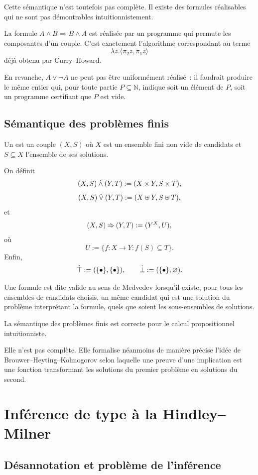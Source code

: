 Cette sémantique n'est toutefois pas complète. Il existe des formules
réalisables qui ne sont pas démontrables intuitionnistement.

\thingy La formule $A\land B\Rightarrow B\land A$ est réalisée par un
programme qui permute les composantes d'un couple. C'est exactement
l'algorithme correspondant au terme
\[
\lambda z.\langle\pi_2z,\pi_1z\rangle
\]
déjà obtenu par Curry--Howard.

En revanche, $A\lor\neg A$ ne peut pas être uniformément réalisé : il
faudrait produire le même entier qui, pour toute partie
$P\subseteq\mathbb{N}$, indique soit un élément de $P$, soit un
programme certifiant que $P$ est vide.

\subsection{Sémantique des problèmes finis}

\thingy Un  est un couple $(X,S)$ où $X$ est un
ensemble fini non vide de candidats et $S\subseteq X$ l'ensemble de ses
solutions.

On définit
\[
(X,S)\mathbin{\mathbin{\dot\land}}(Y,T)
 :=(X\times Y,S\times T),
\]
\[
(X,S)\mathbin{\mathbin{\dot\lor}}(Y,T)
 :=(X\uplus Y,S\uplus T),
\]
et
\[
(X,S)\mathbin{\mathbin{\dot\Rightarrow}}(Y,T)
 :=(Y^X,U),
\]
où
\[
U:=\{f:X\to Y:f(S)\subseteq T\}.
\]
Enfin,
\[
\mathord{\dot\top}:=(\{\bullet\},\{\bullet\}),
\qquad
\mathord{\dot\bot}:=(\{\bullet\},\varnothing).
\]

Une formule est dite valide au sens de Medvedev lorsqu'il existe, pour
tous les ensembles de candidats choisis, un même candidat qui est une
solution du problème interprétant la formule, quels que soient les
sous-ensembles de solutions.

\begin{thm}[Medvedev]
La sémantique des problèmes finis est correcte pour le calcul
propositionnel intuitionniste.
\end{thm}

Elle n'est pas complète. Elle formalise néanmoins de manière précise
l'idée de Brouwer--Heyting--Kolmogorov selon laquelle une preuve d'une
implication est une fonction transformant les solutions du premier
problème en solutions du second.

\section{Inférence de type à la Hindley--Milner}

\subsection{Désannotation et problème de l'inférence}

